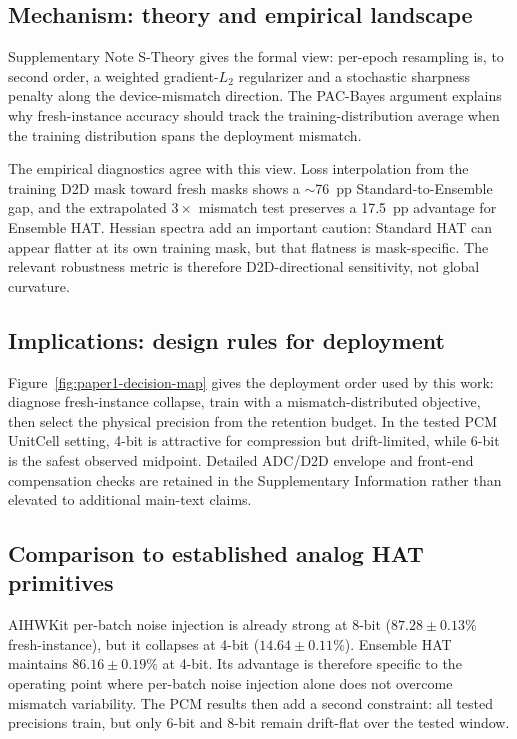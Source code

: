 \subsection{Mechanism: theory and empirical landscape}
\label{subsec:mechanism}

Supplementary Note S-Theory gives the formal view: per-epoch resampling is, to second order, a weighted gradient-$L_2$ regularizer and a stochastic sharpness penalty along the device-mismatch direction. The PAC-Bayes argument explains why fresh-instance accuracy should track the training-distribution average when the training distribution spans the deployment mismatch.

The empirical diagnostics agree with this view. Loss interpolation from the training D2D mask toward fresh masks shows a $\sim$76~pp Standard-to-Ensemble gap, and the extrapolated $3\times$ mismatch test preserves a 17.5~pp advantage for Ensemble HAT. Hessian spectra add an important caution: Standard HAT can appear flatter at its own training mask, but that flatness is mask-specific. The relevant robustness metric is therefore D2D-directional sensitivity, not global curvature.

\subsection{Implications: design rules for deployment}
\label{subsec:implications}

Figure~\ref{fig:paper1-decision-map} gives the deployment order used by this work: diagnose fresh-instance collapse, train with a mismatch-distributed objective, then select the physical precision from the retention budget. In the tested PCM UnitCell setting, 4-bit is attractive for compression but drift-limited, while 6-bit is the safest observed midpoint. Detailed ADC/D2D envelope and front-end compensation checks are retained in the Supplementary Information rather than elevated to additional main-text claims.

\subsection{Comparison to established analog HAT primitives}
\label{subsec:aihwkit-comparison}

AIHWKit \citep{rasch2021aihwkit} per-batch noise injection is already strong at 8-bit ($87.28\pm0.13\%$ fresh-instance), but it collapses at 4-bit ($14.64\pm0.11\%$). Ensemble HAT maintains $86.16\pm0.19\%$ at 4-bit. Its advantage is therefore specific to the operating point where per-batch noise injection alone does not overcome mismatch variability. The PCM results then add a second constraint: all tested precisions train, but only 6-bit and 8-bit remain drift-flat over the tested window.

